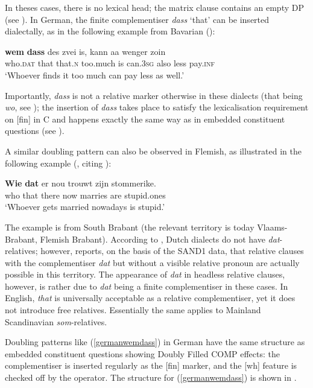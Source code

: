 In theses cases, there is no lexical head; the matrix clause contains an empty DP (see \citealt{vanriemsdijk2006}). In German, the finite complementiser \textit{dass} `that' can be inserted dialectally, as in the following example from Bavarian (\citealt[781, ex. 21c]{weiss2013}):

\ea \gll \textbf{wem} \textbf{dass} des zvei is, kann aa wenger zoin \label{germanwemdass}\\
who.\textsc{dat} that that.\textsc{n} too.much is can.\textsc{3sg} also less pay.\textsc{inf}\\
\glt `Whoever finds it too much can pay less as well.'
\z

Importantly, \textit{dass} is not a relative marker otherwise in these dialects (that being \textit{wo}, see ); the insertion of \textit{dass} takes place to satisfy the lexicalisation requirement on [fin] in C and happens exactly the same way as in embedded constituent questions (see ). 

A similar doubling pattern can also be observed in Flemish, as illustrated in the following example (\citealt[358]{zwart2000}, citing \citealt[143]{vanacker1948}):

\ea \gll \textbf{Wie} \textbf{dat} er nou trouwt zijn stommerike.\\
who that there now marries are stupid.ones\\
\glt `Whoever gets married nowadays is stupid.'
\z

The example is from South Brabant (the relevant territory is today Vlaams-Brabant, Flemish Brabant). According to \citet[357]{zwart2000}, Dutch dialects do not have \textit{dat}-relatives; however, \citet[141]{boef2013} reports, on the basis of the SAND1 data, that relative clauses with the complementiser \textit{dat} but without a visible relative pronoun are actually possible in this territory. The appearance of \textit{dat} in headless relative clauses, however, is rather due to \textit{dat} being a finite complementiser in these cases. In English, \textit{that} is universally acceptable as a relative complementiser, yet it does not introduce free relatives. Essentially the same applies to Mainland Scandinavian \textit{som}-relatives.

Doubling patterns like (\ref{germanwemdass}) in German have the same structure as embedded constituent questions showing Doubly Filled COMP effects: the complementiser is inserted regularly as the [fin] marker, and the [wh] feature is checked off by the operator. The structure for (\ref{germanwemdass}) is shown in .

